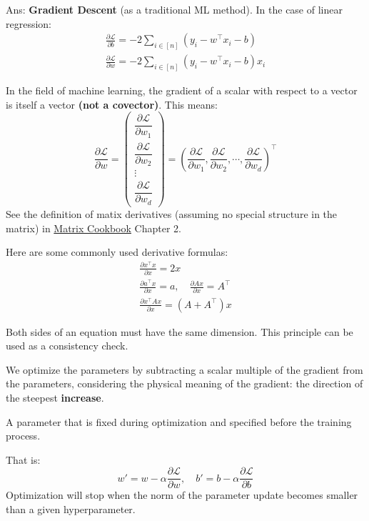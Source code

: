 \documentclass[../main]{subfiles}
\begin{document}
\noindent Ans: \textbf{Gradient Descent} (as a traditional ML method). In the case of linear regression:
\begin{gather}
  \frac{\partial \mathcal L}{\partial b}=-2\sum_{i\in[n]}(y_i-w^\top x_i-b)\\
  \frac{\partial \mathcal L}{\partial w}=-2\sum_{i\in[n]}(y_i-w^\top x_i-b)x_i
\end{gather}
\begin{note}
  In the field of machine learning, the gradient of a scalar with respect to a vector is itself a vector \textbf{(not a covector)}. This means:
  \begin{equation}
    \frac{\partial \mathcal L}{\partial w}=\begin{pmatrix}
      \dfrac{\partial \mathcal L}{\partial w_1}\\
      \dfrac{\partial \mathcal L}{\partial w_2}\\
      \vdots\\
      \dfrac{\partial \mathcal L}{\partial w_d}
    \end{pmatrix}=\left(\frac{\partial \mathcal L}{\partial w_1},
    \frac{\partial \mathcal L}{\partial w_2},
    \cdots,
    \frac{\partial \mathcal L}{\partial w_d}\right)^\top
  \end{equation}
See the definition of matix derivatives (assuming no special structure in the matrix) in \href{https://www.math.uwaterloo.ca/~hwolkowi/matrixcookbook.pdf}{Matrix Cookbook} Chapter 2.
\end{note}
\begin{note}
  Here are some commonly used derivative formulas:
  \begin{gather}
    \frac{\partial x^\top x}{\partial x}=2x\\
    \frac{\partial a^\top x}{\partial x}=a,\quad \frac{\partial Ax}{\partial x}=A^\top\\
    \frac{\partial x^\top Ax}{\partial x}=(A+A^\top)x
  \end{gather}
\end{note}
\begin{remark}
  Both sides of an equation must have the same dimension. This principle can be used as a consistency check.
\end{remark}
We optimize the parameters by subtracting a scalar multiple of the gradient from the parameters, considering the physical meaning of the gradient: the direction of the steepest \textbf{increase}.
\begin{definition}[Hyperparameter]
    A parameter that is fixed during optimization and specified before the training process.
\end{definition} 
That is:
\begin{equation}
    w'=w-\alpha\frac{\partial\mathcal L}{\partial w },\quad b'=b-\alpha\frac{\partial \mathcal L}{\partial b}
\end{equation}
Optimization will stop when the norm of the parameter update becomes smaller than a given hyperparameter.
\end{document}
